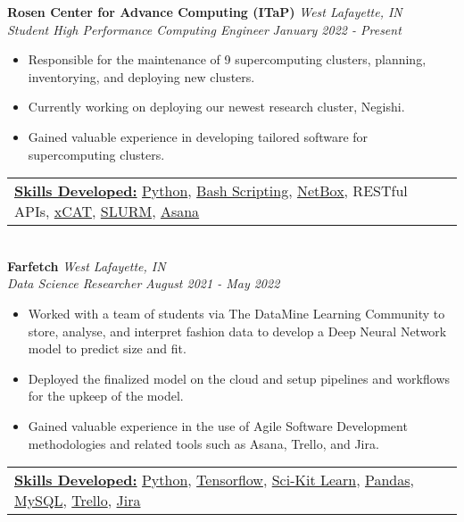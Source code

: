 \documentclass[a4paper]{article}
\begin{document}
\textbf{Rosen Center for Advance Computing (ITaP)} \hfill \textit {West Lafayette, IN}\\
\textit{Student High Performance Computing Engineer} \hfill \textit {January 2022 - Present}\\
\vspace{-1mm}
\begin{itemize} \itemsep 1pt
	\item Responsible for the maintenance of 9 supercomputing clusters, planning, inventorying, and deploying new clusters.
	\item Currently working on deploying our newest research cluster, Negishi.
	\item Gained valuable experience in developing tailored software for supercomputing clusters.
\end{itemize}
\begin{tabular}{ l l }
    \underline{\textbf {Skills Developed:}} \href{https://www.python.org/}{Python}, \href{https://www.gnu.org/software/bash/}{Bash Scripting}, \href{https://docs.netbox.dev/en/stable/}{NetBox}, RESTful APIs, \href{https://xcat.org/}{xCAT}, \href{https://slurm.schedmd.com/overview.html}{SLURM}, \href{https://asana.com/}{Asana} 
\end{tabular} \\ 
\vspace{2mm}
\textbf{Farfetch} \hfill \textit {West Lafayette, IN}\\
\textit{Data Science Researcher} \hfill \textit {August 2021 - May 2022}\\
\vspace{-1mm}
\begin{itemize} \itemsep 1pt
	\item Worked with a team of students via The DataMine Learning Community to store, analyse, and interpret fashion data to develop a Deep Neural Network model to predict size and fit.
	\item Deployed the finalized model on the cloud and setup pipelines and workflows for the upkeep of the model.
	\item Gained valuable experience in the use of Agile Software Development methodologies and related tools such as Asana, Trello, and Jira.
\end{itemize}
\begin{tabular}{ l l }
    \underline{\textbf {Skills Developed:}} \href{https://www.python.org/}{Python}, \href{https://www.tensorflow.org/}{Tensorflow}, \href{https://scikit-learn.org/stable/index.html}{Sci-Kit Learn}, \href{https://pandas.pydata.org/}{Pandas}, \href{https://www.mysql.com/}{MySQL}, \href{https://trello.com/}{Trello}, \href{https://jira.atlassian.com/}{Jira}
\end{tabular} \\ 
\vspace{2mm}
\end{document}

